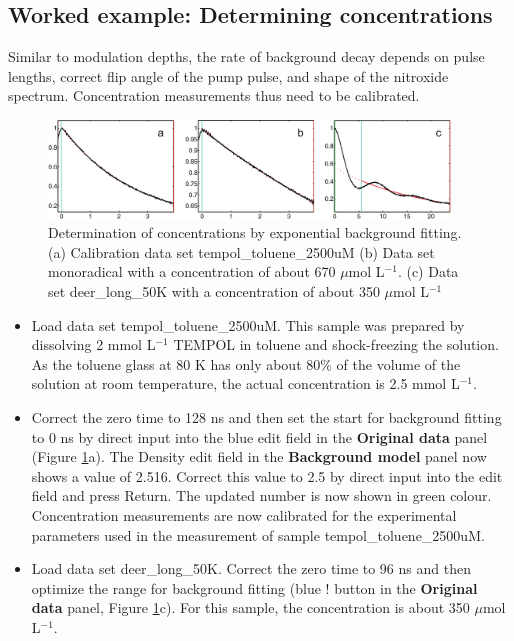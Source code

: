 \documentclass[11pt,a4paper]{article}
\begin{document}
\subsection{Worked example: Determining concentrations}
Similar to modulation depths, the rate of background decay depends on pulse lengths, correct flip angle of the pump pulse, and shape of the nitroxide spectrum. Concentration measurements thus need to be calibrated.

\begin{figure}[ht]
 \vspace{10mm}
 	\begin{center}
		\includegraphics[width=0.95\textwidth]{figure13.pdf}
	\end{center}
	\caption{Determination of concentrations by exponential background fitting.  (a) Calibration data set {\ttfamily tempol\_toluene\_2500uM} (b) Data set {\ttfamily monoradical} with a concentration of about 670 $\mu$mol L$^{-1}$. (c) Data set {\ttfamily deer\_long\_50K} with a concentration of about 350 $\mu$mol L$^{-1}$}
	\label{fig:13}
\end{figure}

\begin{itemize}
	\item Load data set {\ttfamily tempol\_toluene\_2500uM}. This sample was prepared by dissolving 2 mmol L$^{-1}$ TEMPOL in toluene and shock-freezing the solution. As the toluene glass at 80 K has only about 80\% of the volume of the solution at room temperature, the actual concentration is 2.5 mmol L$^{-1}$. 
	\item  Correct the zero time to 128 ns and then set the start for background fitting to 0 ns by direct input into the blue edit field in the {\ttfamily \bf Original data} panel (Figure \ref{fig:13}a). The {\ttfamily Density} edit field in the {\ttfamily \bf Background model} panel now shows a value of 2.516. Correct this value to 2.5 by direct input into the edit field and press Return. The updated number is now shown in green colour. Concentration measurements are now calibrated for the experimental parameters used in the measurement of sample {\ttfamily tempol\_toluene\_2500uM}.
	\item Load data set {\ttfamily deer\_long\_50K}. Correct the zero time to 96 ns and then optimize the range for background fitting (blue {\ttfamily !} button in the {\ttfamily \bf Original data} panel, Figure \ref{fig:13}c). For this sample, the concentration is about 350 $\mu$mol L$^{-1}$.  
\end{itemize}
\end{document}
